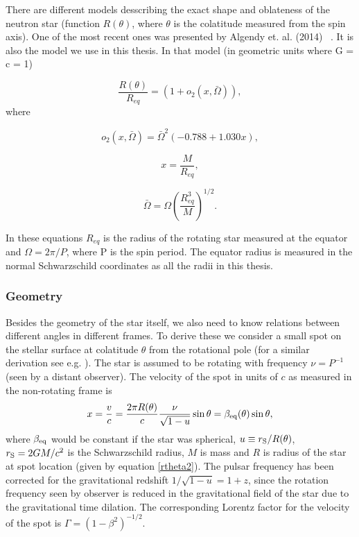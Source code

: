 \documentclass{wihuri}
\def\rg{r_{\rm S}} %
\def\rg{r_{\rm S}} %
\begin{document}
There are different models desscribing the exact shape and oblateness of the neutron star (function $R(\theta)$, where $\theta$ is the colatitude measured from the spin axis).
One of the most recent ones was presented by Algendy et. al. (2014) ~\cite{algendy}. 
It is also the model we use in this thesis. In that model (in geometric units
where G = c = 1)

\begin{equation}
\label{rtheta2}
\frac{R(\theta)}{R_{eq}} = (1 + o_{2}(x,\bar{\Omega})),
\end{equation}
where


\begin{equation}
\label{otwo}
o_{2}(x,\bar{\Omega}) = \bar{\Omega}^{2}(-0.788+1.030x),
\end{equation}


\begin{equation}
\label{rtheta2x}
x = \frac{M}{R_{eq}},
\end{equation}


\begin{equation}
\label{rtheta2omega}
\bar{\Omega} = \Omega (\frac{R_{eq}^{3}}{M})^{1/2}.
\end{equation}


In these equations $R_{eq}$ is the radius of the rotating star measured at the equator and $\Omega = 2\pi/P$, where P is the spin period. The equator radius is measured in the normal Schwarzschild coordinates as all the radii in this thesis.


\subsubsection{Geometry}

Besides the geometry of the star itself, we also need to know relations between different angles in different frames. To derive these we consider a small spot on the stellar surface at colatitude $\theta$ from the rotational pole (for a similar derivation see e.g. \cite{poutabelo}). 
The star is assumed to be rotating  with frequency $\nu=P^{-1}$ (seen by a distant observer).
The velocity of the spot in units of $c$ as measured in the non-rotating frame is 
\begin{equation}
\label{beta2}
x = \frac{v}{c}=\frac{2\pi R(\theta)}{c} \frac{\nu}{\sqrt{1-u}} \sin\theta =\beta_{\rm eq}(\theta) \sin\theta,
\end{equation}
where $\beta_{\rm eq}$ would be constant if the star was spherical, $u\equiv\rg/R(\theta)$, 
$\rg=2GM/c^2$ is the Schwarzschild radius, $M$ is mass and $R$ is
radius of the star at spot location (given by equation \ref{rtheta2}). The pulsar frequency has been corrected for the gravitational redshift $1/\sqrt{1-u}=1+z$, since the rotation frequency seen by observer is reduced in the gravitational field of the star due to the gravitational time dilation. The corresponding Lorentz factor for the velocity of the spot is $\Gamma=(1-\beta^2)^{-1/2}$.
\end{document}
